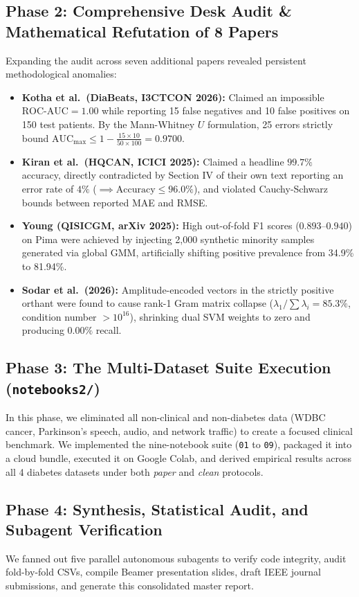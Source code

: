\documentclass[11pt,a4paper]{article}
\begin{document}
\subsection{Phase 2: Comprehensive Desk Audit \& Mathematical Refutation of 8 Papers}
Expanding the audit across seven additional papers revealed persistent methodological anomalies:
\begin{itemize}[leftmargin=1.5em,topsep=1pt,itemsep=1pt]
    \item \textbf{Kotha et al.\ (DiaBeats, I3CTCON 2026):} Claimed an impossible $\text{ROC-AUC} = 1.00$ while reporting 15 false negatives and 10 false positives on 150 test patients. By the Mann-Whitney $U$ formulation, 25 errors strictly bound $\text{AUC}_{\max} \le 1 - \frac{15 \times 10}{50 \times 100} = 0.9700$.
    \item \textbf{Kiran et al.\ (HQCAN, ICICI 2025):} Claimed a headline $99.7\%$ accuracy, directly contradicted by Section IV of their own text reporting an error rate of $4\%$ ($\implies \text{Accuracy} \le 96.0\%$), and violated Cauchy-Schwarz bounds between reported MAE and RMSE.
    \item \textbf{Young (QISICGM, arXiv 2025):} High out-of-fold F1 scores ($0.893$--$0.940$) on Pima were achieved by injecting 2,000 synthetic minority samples generated via global GMM, artificially shifting positive prevalence from 34.9\% to 81.94\%.
    \item \textbf{Sodar et al.\ (2026):} Amplitude-encoded vectors in the strictly positive orthant were found to cause rank-1 Gram matrix collapse ($\lambda_1 / \sum \lambda_i = 85.3\%$, condition number $>10^{16}$), shrinking dual SVM weights to zero and producing $0.00\%$ recall.
\end{itemize}

\subsection{Phase 3: The Multi-Dataset Suite Execution (\texttt{notebooks2/})}
In this phase, we eliminated all non-clinical and non-diabetes data (WDBC cancer, Parkinson's speech, audio, and network traffic) to create a focused clinical benchmark. We implemented the nine-notebook suite (\texttt{01} to \texttt{09}), packaged it into a cloud bundle, executed it on Google Colab, and derived empirical results across all 4 diabetes datasets under both \emph{paper} and \emph{clean} protocols.

\subsection{Phase 4: Synthesis, Statistical Audit, and Subagent Verification}
We fanned out five parallel autonomous subagents to verify code integrity, audit fold-by-fold CSVs, compile Beamer presentation slides, draft IEEE journal submissions, and generate this consolidated master report.
\end{document}
